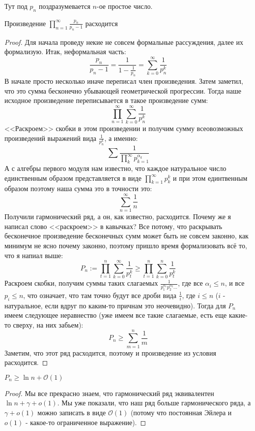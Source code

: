 Тут под $p_n$ поздразумевается $n$-ое простое число.

\begin{statement} \thmslashn

  Произведение $\prod\limits_{n=1}^\infty \frac{p_n}{p_n-1}$ расходится
  \begin{proof} \thmslashn
    
    Для начала проведу некие не совсем формальные рассуждения, далее их формализую. Итак, неформальная часть:
    $$\frac{p_n}{p_n - 1} = \frac{1}{1 - \frac{1}{p_n}} = \sum_{k=0}^\infty\frac{1}{p_n^k}$$
    В начале просто несколько иначе переписал член произведения. Затем заметил, что это сумма бесконечно убывающей геометрической прогрессии. Тогда наше исходное произведение переписывается в такое произведение сумм:
    $$\prod_{n=1}^\infty\sum_{k=0}^\infty\frac{1}{p_n^k}$$
    <<Раскроем>> скобки в этом произведении и получим сумму всеовозможных произведений выражений вида $\frac{1}{p_n^k}$, а именно:
    $$\sum \frac{1}{\prod\limits_k^\infty p_{k=1}^{\alpha_k}}$$
    А с алгебры первого модуля нам известно, что каждое натуральное число единственным образом представляется в виде $\prod_{k=1}^\infty p_k^k$ и при этом единтвенным образом поэтому наша сумма это в точности это:
    $$\sum_{n = 1}^\infty\frac{1}{n}$$
    Получили гармонический ряд, а он, как известно, расходится. Почему же я написал слово <<раскроем>> в кавычках? Все потому, что раскрывать бесконечное произведение бесконечных сумм может быть не совсем законно, как минимум не ясно почему законно, поэтому пришло время формализовать всё то, что я напиал выше:
    $$P_n := \prod_{t=1}^n\sum_{k=0}^\infty\frac{1}{p_t^k} \geqslant \prod_{t=1}^n\sum_{k=0}^n\frac{1}{p_t^k}$$
    Раскроем скобки, получим суммы таких слагаемых $\frac{1}{p_1^{\alpha_1}p_2^{\alpha_2}...}$, где все $\alpha_i \leqslant n$, и все $p_i \leqslant n$, что означает, что там точно будут все дроби вида $\frac{1}{i}$, где $i \leqslant n$ ($i$ - натуральное, если вдруг по каким-то причнам это неочевидно). Тогда для $P_n$ имеем следующее неравнество (уже имеем все такие слагаемые, есть еще какие-то сверху, на них забьем):
    $$P_n \geqslant \sum_{m=1}^n\frac{1}{m}$$
    Заметим, что этот ряд расходится, поэтому и произведение из условия расходится.
  \end{proof}
  \begin{remark} \thmslashn

    $P_n \geqslant \ln n + \mathcal{O}(1)$
    \begin{proof} \thmslashn
      
      
      Мы все прекрасно знаем, что гармонический ряд эквивалентен $\ln n + \gamma + o(1)$. Мы уже показали, что наш ряд больше гармонического ряда, а $\gamma + o(1)$ можно записать в виде $\mathcal{O}(1)$ (потому что постоянная Эйлера и $o(1)$ - какое-то ограниченное выражение). 
    \end{proof}
  \end{remark}
\end{statement}
